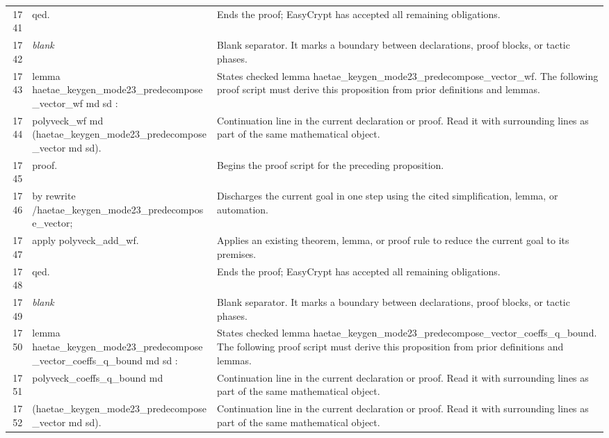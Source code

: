 \documentclass[10pt]{article}
\begin{document}
\begin{longtable}{r L{0.53\textwidth} L{0.37\textwidth}}
1741 & {\ttfamily\scriptsize qed.} & Ends the proof; EasyCrypt has accepted all remaining obligations. \\
1742 & {\ttfamily\scriptsize \emph{blank}} & Blank separator.  It marks a boundary between declarations, proof blocks, or tactic phases. \\
1743 & {\ttfamily\scriptsize lemma haetae\_keygen\_mode23\_predecompose\_vector\_wf md sd :} & States checked lemma haetae\_keygen\_mode23\_predecompose\_vector\_wf.  The following proof script must derive this proposition from prior definitions and lemmas. \\
1744 & {\ttfamily\scriptsize   polyveck\_wf md (haetae\_keygen\_mode23\_predecompose\_vector md sd).} & Continuation line in the current declaration or proof.  Read it with surrounding lines as part of the same mathematical object. \\
1745 & {\ttfamily\scriptsize proof.} & Begins the proof script for the preceding proposition. \\
1746 & {\ttfamily\scriptsize by rewrite /haetae\_keygen\_mode23\_predecompose\_vector;} & Discharges the current goal in one step using the cited simplification, lemma, or automation. \\
1747 & {\ttfamily\scriptsize    apply polyveck\_add\_wf.} & Applies an existing theorem, lemma, or proof rule to reduce the current goal to its premises. \\
1748 & {\ttfamily\scriptsize qed.} & Ends the proof; EasyCrypt has accepted all remaining obligations. \\
1749 & {\ttfamily\scriptsize \emph{blank}} & Blank separator.  It marks a boundary between declarations, proof blocks, or tactic phases. \\
1750 & {\ttfamily\scriptsize lemma haetae\_keygen\_mode23\_predecompose\_vector\_coeffs\_q\_bound md sd :} & States checked lemma haetae\_keygen\_mode23\_predecompose\_vector\_coeffs\_q\_bound.  The following proof script must derive this proposition from prior definitions and lemmas. \\
1751 & {\ttfamily\scriptsize   polyveck\_coeffs\_q\_bound md} & Continuation line in the current declaration or proof.  Read it with surrounding lines as part of the same mathematical object. \\
1752 & {\ttfamily\scriptsize     (haetae\_keygen\_mode23\_predecompose\_vector md sd).} & Continuation line in the current declaration or proof.  Read it with surrounding lines as part of the same mathematical object. \\

\end{longtable}
\end{document}
